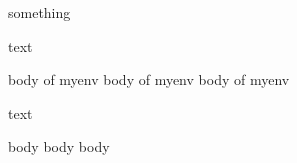 \if
	something
\fi

text

\begin{myenv}
	body of myenv
	body of myenv
	body of myenv
\end{myenv}

text

\begin{anotherenv}
	body
	body
	body
\end{anotherenv}

